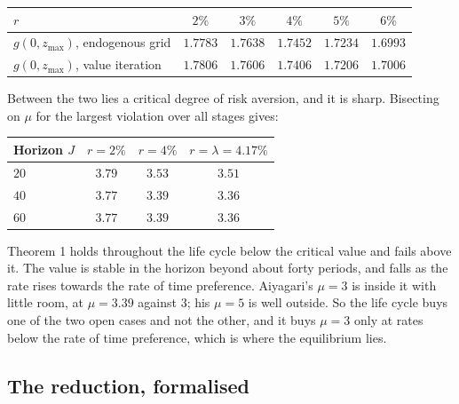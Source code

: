 \begingroup\small
\begin{center}
\begin{tabular}{@{}lccccc@{}}
\toprule
$r$ & $2\%$ & $3\%$ & $4\%$ & $5\%$ & $6\%$ \\
\midrule
$g(0,z_{\max})$, endogenous grid & $1.7783$ & $1.7638$ & $1.7452$ & $1.7234$ & $1.6993$ \\
$g(0,z_{\max})$, value iteration & $1.7806$ & $1.7606$ & $1.7406$ & $1.7206$ & $1.7006$ \\
\bottomrule
\end{tabular}
\end{center}
\endgroup

Between the two lies a critical degree of risk aversion, and it is sharp. Bisecting on $\mu$ for
the largest violation over all stages gives:

\begingroup\small
\begin{center}
\begin{tabular}{@{}lccc@{}}
\toprule
Horizon $J$ & $r=2\%$ & $r=4\%$ & $r=\lambda=4.17\%$ \\
\midrule
$20$ & $3.79$ & $3.53$ & $3.51$ \\
$40$ & $3.77$ & $3.39$ & $3.36$ \\
$60$ & $3.77$ & $3.39$ & $3.36$ \\
\bottomrule
\end{tabular}
\end{center}
\endgroup

Theorem 1 holds throughout the life cycle below the critical value and fails above it. The value
is stable in the horizon beyond about forty periods, and falls as the rate rises towards the rate
of time preference. Aiyagari's $\mu=3$ is inside it with little room, at $\mu=3.39$ against
$3$; his $\mu=5$ is well outside. So the life cycle buys one of the two open cases and not the
other, and it buys $\mu=3$ only at rates below the rate of time preference, which is where the
equilibrium lies.

\subsection{The reduction, formalised}

